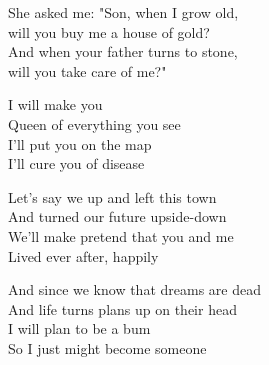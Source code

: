 
\cho{}
She asked me: "Son, when I grow old,\\
will you buy me a house of gold?\\
And when your father turns to stone,\\
will you take care of me?"

\cho{}

\re{*:}
I will make you\\
Queen of everything you see\\
I'll put you on the map\\
I'll cure you of disease 

\ve{}
Let's say we up and left this town\\
And turned our future upside-down\\
We'll make pretend that you and me\\
Lived ever after, happily

\cho{}

\re{*:}	

\ve{}
And since we know that dreams are dead\\
And life turns plans up on their head\\
I will plan to be a bum\\
So I just might become someone

\cho{}

\re{*:}

\esong